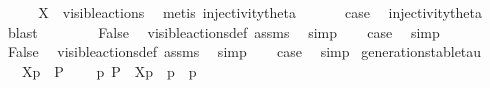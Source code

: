 \begin{isabellebody}
\ {}\isanewline
\ \ \isamarkupfalse%
\ {\isacartoucheopen}X\ {\isasymsubseteq}\ visible{\isacharunderscore}{\kern0pt}actions{\isacartoucheclose}\ \isamarkupfalse%
\ {\isacharparenleft}{\kern0pt}metis\ injectivity{\isacharunderscore}{\kern0pt}theta{\isacharparenleft}{\kern0pt}{}{\isacharparenright}{\kern0pt}{\isacharparenright}{\kern0pt}\isanewline
\ \ \isamarkupfalse%
\ {}\ \isamarkupfalse%
\ {\isacharquery}{\kern0pt}case\ \isamarkupfalse%
\ injectivity{\isacharunderscore}{\kern0pt}theta{\isacharparenleft}{\kern0pt}{}{\isacharparenright}{\kern0pt}\ \isamarkupfalse%
\ blast\isanewline
{}\isamarkupfalse%
\isanewline
\ \ \isamarkupfalse%
\ {}\isanewline
\ \ \isamarkupfalse%
\ False\ \isamarkupfalse%
\ visible{\isacharunderscore}{\kern0pt}actions{\isacharunderscore}{\kern0pt}def\ assms{\isacharparenleft}{\kern0pt}{}{\isacharparenright}{\kern0pt}\ \isamarkupfalse%
\ simp\isanewline
\ \ \isamarkupfalse%
\ {\isacharquery}{\kern0pt}case\ \isamarkupfalse%
\ simp\isanewline
{}\isamarkupfalse%
\isanewline
\ \ \isamarkupfalse%
\ {}\isanewline
\ \ \isamarkupfalse%
\ False\ \isamarkupfalse%
\ visible{\isacharunderscore}{\kern0pt}actions{\isacharunderscore}{\kern0pt}def\ assms{\isacharparenleft}{\kern0pt}{}{\isacharparenright}{\kern0pt}\ \isamarkupfalse%
\ simp\isanewline
\ \ \isamarkupfalse%
\ {\isacharquery}{\kern0pt}case\ \isamarkupfalse%
\ simp\isanewline
{}\isamarkupfalse%
%
\endisatagproof
{\isafoldproof}%
%
\isadelimproof
\isanewline
%
\endisadelimproof
\isanewline
{}\isamarkupfalse%
\ generation{\isacharunderscore}{\kern0pt}stable{\isacharunderscore}{\kern0pt}tau{\isacharcolon}{\kern0pt}\isanewline
\ \ \ {\isacartoucheopen}{\isasymtheta}{\isacharbrackleft}{\kern0pt}X{\isacharbrackright}{\kern0pt}{\isacharparenleft}{\kern0pt}p{\isacharparenright}{\kern0pt}\ {\isasymlongmapsto}\isactrlsup {\isasymtheta}{\isasymtau}\ P{\isacharprime}{\kern0pt}{\isacartoucheclose}\isanewline
\ \ \ {\isacartoucheopen}{\isasymexists}\ p{\isacharprime}{\kern0pt}{\isachardot}{\kern0pt}\ P{\isacharprime}{\kern0pt}\ {\isacharequal}{\kern0pt}\ {\isasymtheta}{\isacharbrackleft}{\kern0pt}X{\isacharbrackright}{\kern0pt}{\isacharparenleft}{\kern0pt}p{\isacharprime}{\kern0pt}{\isacharparenright}{\kern0pt}\ {\isasymand}\ p\ {\isasymlongmapsto}{\isasymtau}\ p{\isacharprime}{\kern0pt}{\isacartoucheclose}\isanewline

\end{isabellebody}
